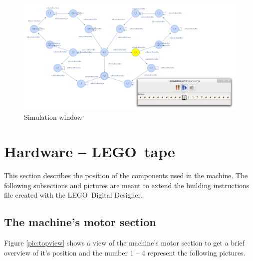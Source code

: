 \documentclass[%
  a4paper,%
  11pt,%
  blue,%
  hyperref	%
  ]{tubsartcl}
\begin{document}
\begin{figure}[!htb]
\begin{center}
\includegraphics[scale=0.35]{graphics_gui/simulation_window.png}
\end{center}
\caption{Simulation window}
\label{pic:simulation_window}
\end{figure}

\newpage

\section{Hardware -- LEGO\textregistered\, tape}

This section describes the position of the components used in the machine. The following subsections and pictures are meant to extend the building instructions file created with the LEGO\textregistered\, Digital Designer.

\subsection{The machine's motor section}

Figure \ref{pic:topview} shows a view of the machine's motor section to get a brief overview of it's position and the number 1 -- 4 represent the following pictures.
\end{document}
